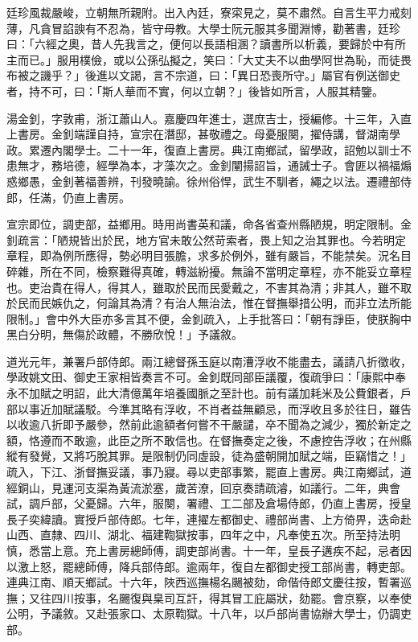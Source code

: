 \begin{pinyinscope}
廷珍風裁嚴峻，立朝無所親附。出入內廷，寮寀見之，莫不肅然。自言生平力戒刻薄，凡貪冒諂諛有不忍為，皆守母教。大學士阮元服其多聞淵博，勸著書，廷珍曰：「六經之奧，昔人先我言之，便何以長語相溷？讀書所以析義，要歸於中有所主而已。」服用樸儉，或以公孫弘擬之，笑曰：「大丈夫不以曲學阿世為恥，而徒畏布被之譏乎？」後進以文謁，言不宗道，曰：「異日恐喪所守。」屬官有例送御史者，持不可，曰：「斯人華而不實，何以立朝？」後皆如所言，人服其精鑒。

湯金釗，字敦甫，浙江蕭山人。嘉慶四年進士，選庶吉士，授編修。十三年，入直上書房。金釗端謹自持，宣宗在潛邸，甚敬禮之。母憂服闋，擢侍講，督湖南學政。累遷內閣學士。二十一年，復直上書房。典江南鄉試，留學政，詔勉以訓士不患無才，務培德，經學為本，才藻次之。金釗闡揚詔旨，通誡士子。會匪以禍福煽惑鄉愚，金釗著福善辨，刊發曉諭。徐州俗悍，武生不馴者，繩之以法。遷禮部侍郎，任滿，仍直上書房。

宣宗即位，調吏部，益鄉用。時用尚書英和議，命各省查州縣陋規，明定限制。金釗疏言：「陋規皆出於民，地方官未敢公然苛索者，畏上知之治其罪也。今若明定章程，即為例所應得，勢必明目張膽，求多於例外，雖有嚴旨，不能禁矣。況名目碎雜，所在不同，檢察難得真確，轉滋紛擾。無論不當明定章程，亦不能妥立章程也。吏治貴在得人，得其人，雖取於民而民愛戴之，不害其為清；非其人，雖不取於民而民嫉仇之，何論其為清？有治人無治法，惟在督撫舉措公明，而非立法所能限制。」會中外大臣亦多言其不便，金釗疏入，上手批答曰：「朝有諍臣，使朕胸中黑白分明，無傷於政體，不勝欣悅！」予議敘。

道光元年，兼署戶部侍郎。兩江總督孫玉庭以南漕浮收不能盡去，議請八折徵收，學政姚文田、御史王家相皆奏言不可。金釗既同部臣議覆，復疏爭曰：「康熙中奉永不加賦之明詔，此大清億萬年培養國脈之至計也。前有議加耗米及公費銀者，戶部以事近加賦議駁。今準其略有浮收，不肖者益無顧忌，而浮收且多於往日，雖告以收逾八折即予嚴參，然前此逾額者何嘗不干嚴譴，卒不聞為之減少，獨於新定之額，恪遵而不敢逾，此臣之所不敢信也。在督撫奏定之後，不慮控告浮收；在州縣縱有發覺，又將巧脫其罪。是限制仍同虛設，徒為盛朝開加賦之端，臣竊惜之！」疏入，下江、浙督撫妥議，事乃寢。尋以吏部事繁，罷直上書房。典江南鄉試，道經銅山，見運河支渠為黃流淤塞，歲苦潦，回京奏請疏濬，如議行。二年，典會試，調戶部，父憂歸。六年，服闋，署禮、工二部及倉場侍郎，仍直上書房，授皇長子奕緯讀。實授戶部侍郎。七年，連擢左都御史、禮部尚書、上方倚畀，迭命赴山西、直隸、四川、湖北、福建鞫獄按事，四年之中，凡奉使五次。所至持法明慎，悉當上意。充上書房總師傅，調吏部尚書。十一年，皇長子遘疾不起，忌者因以激上怒，罷總師傅，降兵部侍郎。逾兩年，復自左都御史授工部尚書，轉吏部。連典江南、順天鄉試。十六年，陜西巡撫楊名颺被劾，命偕侍郎文慶往按，暫署巡撫；又往四川按事，名颺復與臬司互訐，得其冒工庇屬狀，劾罷。會京察，以奉使公明，予議敘。又赴張家口、太原鞫獄。十八年，以戶部尚書協辦大學士，仍調吏部。


\end{pinyinscope}
